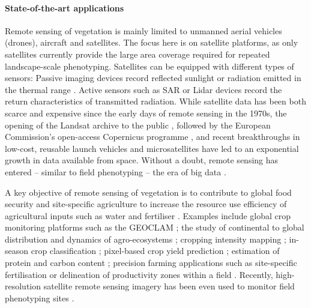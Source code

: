\paragraph{State-of-the-art applications}
Remote sensing of vegetation is mainly limited to unmanned aerial vehicles (drones), aircraft and satellites. The focus here is on satellite platforms, as only satellites currently provide the large area coverage required for repeated landscape-scale phenotyping. Satellites can be equipped with different types of sensors: Passive imaging devices record reflected sunlight or radiation emitted in the thermal range \citep{khanal_overview_2017}. Active sensors such as \gls{SAR} \citep{steele-dunne_radar_2017} or \gls{Lidar} devices \citep{dubayah_gedi_2022} record the return characteristics of transmitted radiation. While satellite data has been both scarce and expensive since the early days of remote sensing in the 1970s, the opening of the Landsat archive to the public \citep{zhu_benefits_2019}, followed by the European Commission's open-access Copernicus programme \citep{harris_open_2015}, and recent breakthroughs in low-cost, reusable launch vehicles \citep{reddy_spacex_2018} and microsatellites \citep{pelton_key_2019} have led to an exponential growth in data available from space. Without a doubt, remote sensing has entered -- similar to field phenotyping -- the era of big data \citep{sudmanns_big_2020}.

A key objective of remote sensing of vegetation is to contribute to global food security and site-specific agriculture to increase the resource use efficiency of agricultural inputs such as water and fertiliser \citep{bach_sustainable_2018}. Examples include global crop monitoring platforms such as the \gls{GEOCLAM} \citep{becker-reshef_strengthening_2020}; the study of continental to global distribution and dynamics of agro-ecosystems \citep{bolton_continental-scale_2020, dandrimont_detecting_2020, winkler_global_2021, moon_multiscale_2021}; cropping intensity mapping \citep{liu_mapping_2020}; in-season crop classification \citep{ruswurm_end--end_2023}; pixel-based crop yield prediction \citep{perich_pixel-based_2023, amin_-season_2024}; estimation of protein and carbon content \cite{feret_prospect-pro_2021, longmire_estimation_2023}; precision farming applications such as site-specific fertilisation \citep{argento_site-specific_2021} or delineation of productivity zones within a field \citep{georgi_automatic_2018}. Recently, high-resolution satellite remote sensing imagery has been even used to monitor field phenotyping sites \citep{pinto_satellite_2023}.

